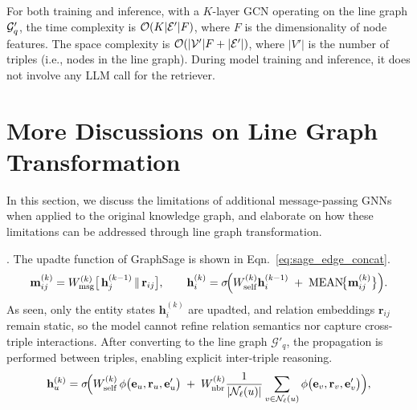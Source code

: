  For both training and inference, with a $K$-layer GCN operating on the line graph $\mathcal{G}_q'$, the time complexity is $\mathcal{O}(K|\mathcal{E}'| F)$, where $F$ is the dimensionality of node features. The space complexity is $\mathcal{O}(|\mathcal{V}'|F + |\mathcal{E}'|)$, where $|V'|$ is the number of triples (i.e., nodes in the line graph). During model training and inference, it does not involve any LLM call for the retriever. 

\section{More Discussions on Line Graph Transformation}
\label{discuss_graph_trasnform}
In this section, we discuss the limitations of additional message-passing GNNs when applied to the original knowledge graph, and elaborate on how these limitations can be addressed through line graph transformation.

. The upadte function of GraphSage is shown in Eqn.~\ref{eq:sage_edge_concat}. 
\begin{equation}\label{eq:sage_edge_concat}
  \mathbf m_{ij}^{(k)}
    = W_{\text{msg}}^{(k)}
      \bigl[\,
        \mathbf h_j^{(k-1)} \,\Vert\, \mathbf r_{ij}
      \bigr],
  \qquad
  \mathbf h_i^{(k)}
    = \sigma\!\Bigl(
        W_{\text{self}}^{(k)}\mathbf h_i^{(k-1)}
        \;+\;
        \mathrm{MEAN}\!\bigl\{
          \mathbf m_{ij}^{(k)}
        \bigr\}
      \Bigr).
\end{equation}
As seen, only the entity states $\mathbf h_i^{(k)}$ are upadted, and relation embeddings $\mathbf r_{ij}$ remain static, so the model cannot refine relation semantics nor capture cross-triple interactions. 
After converting to the line graph $\mathcal G'_q$, the propagation is performed between triples, enabling explicit inter-triple reasoning.
\begin{equation}\label{eq:sage_line_concat}
  \mathbf h_u^{(k)}
    = \sigma\!\Bigl(
        W_{\text{self}}^{(k)}
        \,\phi\bigl(\mathbf e_u,\mathbf r_u,\mathbf e_u'\bigr)
        \;+\;
        W_{\text{nbr}}^{(k)}
        \frac{1}{|\mathcal N_\ell(u)|}
        \sum_{v\in\mathcal N_\ell(u)}
          \phi\bigl(\mathbf e_v,\mathbf r_v,\mathbf e_v'\bigr)
      \Bigr),
\end{equation}

